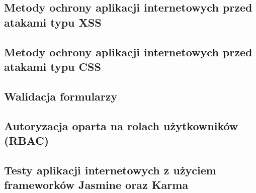 \subsection{Metody ochrony aplikacji internetowych przed atakami typu XSS}


\subsection{Metody ochrony aplikacji internetowych przed atakami typu CSS}

\subsection{Walidacja formularzy}

\subsection{Autoryzacja oparta na rolach użytkowników (RBAC)}

\subsection{Testy aplikacji internetowych z użyciem frameworków Jasmine oraz Karma}


